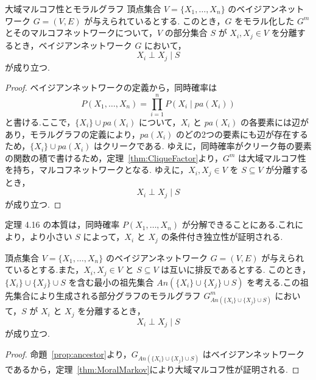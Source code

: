 \documentclass[uplatex, dvipdfmx]{jsarticle}
\begin{document}
\begin{thm}[label={thm:MoralMarkov}]{大域マルコフ性とモラルグラフ}
  頂点集合 $V = \{X_1, \dots, X_n\}$ のベイジアンネットワーク $G = (V, E)$ が与えられているとする.
  このとき，$G$ をモラル化した $G^m$ とそのマルコフネットワークについて，$V$ の部分集合 $S$ が $X_i, X_j \in V$ を分離するとき，ベイジアンネットワーク $G$ において，
  \begin{equation}
      X_i \perp X_j \mid S
  \end{equation}
  が成り立つ.
\end{thm}

\begin{proof}
  ベイジアンネットワークの定義から，同時確率は
  \begin{equation}
      P(X_1, \dots, X_n) = \prod_{i=1}^n P(X_i \mid pa(X_i))
  \end{equation}
  と書ける.ここで，$\{X_i\} \cup pa(X_i)$ について，$X_i$ と $pa(X_i)$ の各要素には辺があり，モラルグラフの定義により，$pa(X_i)$ のどの2つの要素にも辺が存在するため，$\{X_i\} \cup pa(X_i)$ はクリークである.
  ゆえに，同時確率がクリーク毎の要素の関数の積で書けるため，定理~\ref{thm:CliqueFactor}より，$G^m$ は大域マルコフ性を持ち，マルコフネットワークとなる.
  ゆえに，$X_i, X_j \in V$ を $S \subseteq V$ が分離するとき，
  \begin{equation}
      X_i \perp X_j \mid S
  \end{equation}
  が成り立つ.
\end{proof}

定理 4.16 の本質は，同時確率 $P(X_1, \dots, X_n)$ が分解できることにある.これにより，より小さい $S$ によって，$X_i$ と $X_j$ の条件付き独立性が証明される.

\begin{cor}[label={cor:Markov}]{}
  頂点集合 $V = \{X_1, \dots, X_n\}$ のベイジアンネットワーク $G = (V, E)$ が与えられているとする.また，$X_i, X_j \in V$ と $S \subseteq V$ は互いに排反であるとする.
  このとき，$\{X_i\} \cup \{X_j\} \cup S$ を含む最小の祖先集合 $An(\{X_i\} \cup \{X_j\} \cup S)$ を考える.この祖先集合により生成される部分グラフのモラルグラフ $G^m_{An(\{X_i\} \cup \{X_j\} \cup S)}$ において，$S$ が $X_i$ と $X_j$ を分離するとき，
  \begin{equation}
      X_i \perp X_j \mid S
  \end{equation}
  が成り立つ.
\end{cor}

\begin{proof}
  命題~\ref{prop:ancestor}より，$G_{An(\{X_i\} \cup \{X_j\} \cup S)}$ はベイジアンネットワークであるから，定理~\ref{thm:MoralMarkov}により大域マルコフ性が証明される.
\end{proof}
\end{document}
